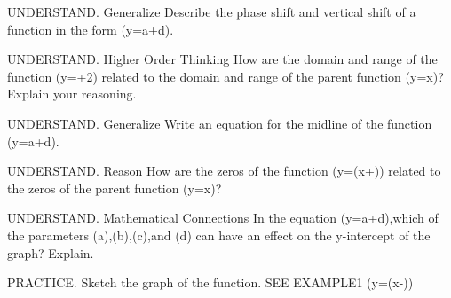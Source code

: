 \documentclass{article}
\newenvironment{practice}[2]{}{}        %
\newcommand{\answer}[1]{}               %
\newcommand{\placeholder}[2]{}          %
\newcommand{\te}[1]{}                   %
\begin{document}
\begin{practice}{11}{2}
UNDERSTAND. Generalize Describe the phase shift and vertical shift of a function in the form (y=a\sin[b(x-c)]+d).
\answer{When(c>0),the phase shift is right c units. When(c<0),the phase shift is left|c| units. When(d>0),the vertical shift is up d units. When(d<0),the vertical shift is down d units.}
\te{Printed down d units for negative d; likely down|d| units.}
\end{practice}
\begin{practice}{12}{2}
UNDERSTAND. Higher Order Thinking How are the domain and range of the function (y=\cos[3(x-\frac{2\pi}3)]+2) related to the domain and range of the parent function (y=\cos x)? Explain your reasoning.
\answer{The graph of(y=\frac14\cos[3(x-\frac{2\pi}3)]+2) is compressed by a factor of(1/4),shifted right(2\pi/3) units,and shifted up2 units from the graph of(y=\cos x). The horizontal shift does not affect the domain and range of the function. The compression factor divides the range interval by one-fourth and the vertical shift up2 units adds2 units to the compressed range.}
\te{Printed divides by one-fourth; likely multiplies by one-fourth.}
\end{practice}
\begin{practice}{13}{2}
UNDERSTAND. Generalize Write an equation for the midline of the function (y=a\cos[b(x-c)]+d).
\answer{(y=d)}
\end{practice}
\begin{practice}{14}{2}
UNDERSTAND. Reason How are the zeros of the function (y=\sin(x+\frac{})) related to the zeros of the parent function (y=\sin x)?
\answer{The zeros of(y=\sin(x+\frac\pi3)) are shifted left(pi/3) units of the zeros of(y=\sin x).}
\end{practice}
\begin{practice}{15}{2}
UNDERSTAND. Mathematical Connections In the equation (y=a\sin[b(x-c)]+d),which of the parameters (a),(b),(c),and (d) can have an effect on the y-intercept of the graph? Explain.
\answer{Answers may vary. Sample: The y-intercept is always affected by the value of d. When(c\neq0),the phase shift means that a,b,and c can also affect the y-intercept by changing the amplitude and period.}
\end{practice}
\begin{practice}{16}{2}
PRACTICE. Sketch the graph of the function. SEE EXAMPLE1
(y=\cos(x-\frac{}))
\answer{Graph shown.}
\placeholder{graph}{Red cos(x-pi/4) on square grid,arrowed x,y axes,O; x ticks pi/2 labeled-pi,pi; y ticks1/2 labeled-1,1;window-2pi..2pi,-2..2. Max(pi/4,1),min(-3pi/4,-1),(5pi/4,-1),end arrows.}
\end{practice}
\end{document}
